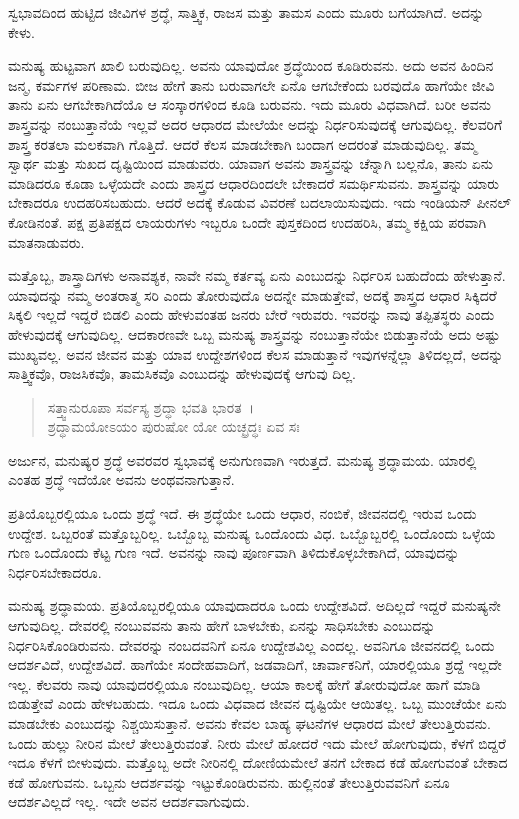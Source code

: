 {\small ಸ್ವಭಾವದಿಂದ ಹುಟ್ಟಿದ ಜೀವಿಗಳ ಶ್ರದ್ಧೆ, ಸಾತ್ತ್ವಿಕ, ರಾಜಸ ಮತ್ತು ತಾಮಸ ಎಂದು ಮೂರು ಬಗೆಯಾಗಿದೆ. ಅದನ್ನು ಕೇಳು.}

ಮನುಷ್ಯ ಹುಟ್ಟವಾಗ ಖಾಲಿ ಬರುವುದಿಲ್ಲ. ಅವನು ಯಾವುದೋ ಶ್ರದ್ಧೆಯಿಂದ ಕೂಡಿರುವನು. ಅದು ಅವನ ಹಿಂದಿನ ಜನ್ಮ, ಕರ್ಮಗಳ ಪರಿಣಾಮ. ಬೀಜ ಹೇಗೆ ತಾನು ಬರುವಾಗಲೇ ಏನೊ ಆಗಬೇಕೆಂದು ಬರವುದೊ ಹಾಗೆಯೇ ಜೀವಿ ತಾನು ಏನು ಆಗಬೇಕಾಗಿದೆಯೊ ಆ ಸಂಸ್ಕಾರಗಳಿಂದ ಕೂಡಿ ಬರುವನು. ಇದು ಮೂರು ವಿಧವಾಗಿದೆ. ಬರೀ ಅವನು ಶಾಸ್ತ್ರವನ್ನು ನಂಬುತ್ತಾನೆಯೆ ಇಲ್ಲವೆ ಅದರ ಆಧಾರದ ಮೇಲೆಯೇ ಅದನ್ನು ನಿರ್ಧರಿಸುವುದಕ್ಕೆ ಆಗುವುದಿಲ್ಲ. ಕೆಲವರಿಗೆ ಶಾಸ್ತ್ರ ಕರತಲಾ ಮಲಕವಾಗಿ ಗೊತ್ತಿದೆ. ಆದರೆ ಕೆಲಸ ಮಾಡಬೇಕಾಗಿ ಬಂದಾಗ ಅದರಂತೆ ಮಾಡುವುದಿಲ್ಲ. ತಮ್ಮ ಸ್ವಾರ್ಥ ಮತ್ತು ಸುಖದ ದೃಷ್ಟಿಯಿಂದ ಮಾಡುವರು. ಯಾವಾಗ ಅವನು ಶಾಸ್ತ್ರವನ್ನು ಚೆನ್ನಾಗಿ ಬಲ್ಲನೊ, ತಾನು ಏನು ಮಾಡಿದರೂ ಕೂಡಾ ಒಳ್ಳೆಯದೇ ಎಂದು ಶಾಸ್ತ್ರದ ಆಧಾರದಿಂದಲೇ ಬೇಕಾದರೆ ಸಮರ್ಥಿಸುವನು. ಶಾಸ್ತ್ರವನ್ನು ಯಾರು ಬೇಕಾದರೂ ಉದಹರಿಸಬಹುದು. ಆದರೆ ಅದಕ್ಕೆ ಕೊಡುವ ವಿವರಣೆ ಬದಲಾಯಿಸುವುದು. ಇದು ಇಂಡಿಯನ್ ಪೀನಲ್ ಕೋಡಿನಂತೆ. ಪಕ್ಷ ಪ್ರತಿಪಕ್ಷದ ಲಾಯರುಗಳು ಇಬ್ಬರೂ ಒಂದೇ ಪುಸ್ತಕದಿಂದ ಉದಹರಿಸಿ, ತಮ್ಮ ಕಕ್ಷಿಯ ಪರವಾಗಿ ಮಾತನಾಡುವರು.

ಮತ್ತೊಬ್ಬ, ಶಾಸ್ತ್ರಾದಿಗಳು ಅನಾವಶ್ಯಕ, ನಾವೇ ನಮ್ಮ ಕರ್ತವ್ಯ ಏನು ಎಂಬುದನ್ನು ನಿರ್ಧರಿಸ ಬಹುದೆಂದು ಹೇಳುತ್ತಾನೆ. ಯಾವುದನ್ನು ನಮ್ಮ ಅಂತರಾತ್ಮ ಸರಿ ಎಂದು ತೋರುವುದೊ ಅದನ್ನೇ ಮಾಡುತ್ತೇವೆ, ಅದಕ್ಕೆ ಶಾಸ್ತ್ರದ ಆಧಾರ ಸಿಕ್ಕಿದರೆ ಸಿಕ್ಕಲಿ ಇಲ್ಲದೆ ಇದ್ದರೆ ಬಿಡಲಿ ಎಂದು ಹೇಳುವಂತಹ ಜನರು ಬೇರೆ ಇರುವರು. ಇವರನ್ನು ನಾವು ತಪ್ಪಿತಸ್ಥರು ಎಂದು ಹೇಳುವುದಕ್ಕೆ ಆಗುವುದಿಲ್ಲ. ಆದಕಾರಣವೇ ಒಬ್ಬ ಮನುಷ್ಯ ಶಾಸ್ತ್ರವನ್ನು ನಂಬುತ್ತಾನೆಯೇ ಬಿಡುತ್ತಾನೆಯೆ ಅದು ಅಷ್ಟು ಮುಖ್ಯವಲ್ಲ. ಅವನ ಜೀವನ ಮತ್ತು ಯಾವ ಉದ್ದೇಶಗಳಿಂದ ಕೆಲಸ ಮಾಡುತ್ತಾನೆ ಇವುಗಳನ್ನೆಲ್ಲಾ ತಿಳಿದಲ್ಲದೆ, ಅದನ್ನು ಸಾತ್ತ್ವಿಕವೊ, ರಾಜಸಿಕವೊ, ತಾಮಸಿಕವೊ ಎಂಬುದನ್ನು ಹೇಳುವುದಕ್ಕೆ ಆಗುವು ದಿಲ್ಲ.

\begin{verse}
ಸತ್ತ್ವಾನುರೂಪಾ ಸರ್ವಸ್ಯ ಶ್ರದ್ಧಾ ಭವತಿ ಭಾರತ~।\\ಶ್ರದ್ಧಾಮಯೋಽಯಂ ಪುರುಷೋ ಯೋ ಯಚ್ಛ್ರದ್ಧಃ ಏವ ಸಃ 
\end{verse}

{\small ಅರ್ಜುನ, ಮನುಷ್ಯರ ಶ್ರದ್ಧೆ ಅವರವರ ಸ್ವಭಾವಕ್ಕೆ ಅನುಗುಣವಾಗಿ ಇರುತ್ತದೆ. ಮನುಷ್ಯ ಶ್ರದ್ಧಾಮಯ. ಯಾರಲ್ಲಿ ಎಂತಹ ಶ್ರದ್ಧೆ ಇದೆಯೋ ಅವನು ಅಂಥವನಾಗುತ್ತಾನೆ.}

ಪ್ರತಿಯೊಬ್ಬರಲ್ಲಿಯೂ ಒಂದು ಶ್ರದ್ಧೆ ಇದೆ. ಈ ಶ್ರದ್ಧೆಯೇ ಒಂದು ಆಧಾರ, ನಂಬಿಕೆ, ಜೀವನದಲ್ಲಿ ಇರುವ ಒಂದು ಉದ್ದೇಶ. ಒಬ್ಬರಂತೆ ಮತ್ತೊಬ್ಬರಿಲ್ಲ. ಒಬ್ಬೊಬ್ಬ ಮನುಷ್ಯ ಒಂದೊಂದು ವಿಧ. ಒಬ್ಬೊಬ್ಬರಲ್ಲಿ ಒಂದೊಂದು ಒಳ್ಳೆಯ ಗುಣ ಒಂದೊಂದು ಕೆಟ್ಟ ಗುಣ ಇದೆ. ಅವನನ್ನು ನಾವು ಪೂರ್ಣವಾಗಿ ತಿಳಿದುಕೊಳ್ಳಬೇಕಾಗಿದೆ, ಯಾವುದನ್ನು ನಿರ್ಧರಿಸಬೇಕಾದರೂ.

ಮನುಷ್ಯ ಶ್ರದ್ಧಾಮಯ. ಪ್ರತಿಯೊಬ್ಬರಲ್ಲಿಯೂ ಯಾವುದಾದರೂ ಒಂದು ಉದ್ದೇಶವಿದೆ. ಅದಿಲ್ಲದೆ ಇದ್ದರೆ ಮನುಷ್ಯನೇ ಆಗುವುದಿಲ್ಲ. ದೇವರಲ್ಲಿ ನಂಬುವವನು ತಾನು ಹೇಗೆ ಬಾಳಬೇಕು, ಏನನ್ನು ಸಾಧಿಸಬೇಕು ಎಂಬುದನ್ನು ನಿರ್ಧರಿಸಿಕೊಂಡಿರುವನು. ದೇವರನ್ನು ನಂಬದವನಿಗೆ ಏನೂ ಉದ್ದೇಶವಿಲ್ಲ ಎಂದಲ್ಲ. ಅವನಿಗೂ ಜೀವನದಲ್ಲಿ ಒಂದು ಆದರ್ಶವಿದೆ, ಉದ್ದೇಶವಿದೆ. ಹಾಗೆಯೇ ಸಂದೇಹವಾದಿಗೆ, ಜಡವಾದಿಗೆ, ಚಾರ್ವಾಕನಿಗೆ, ಯಾರಲ್ಲಿಯೂ ಶ್ರದ್ದೆ ಇಲ್ಲದೇ ಇಲ್ಲ. ಕೆಲವರು ನಾವು ಯಾವುದರಲ್ಲಿಯೂ ನಂಬುವುದಿಲ್ಲ. ಆಯಾ ಕಾಲಕ್ಕೆ ಹೇಗೆ ತೋರುವುದೋ ಹಾಗೆ ಮಾಡಿ ಬಿಡುತ್ತೇವೆ ಎಂದು ಹೇಳಬಹುದು. ಇದೂ ಒಂದು ವಿಧವಾದ ಜೀವನ ದೃಷ್ಟಿಯೇ ಆಯಿತಲ್ಲ. ಒಬ್ಬ ಮುಂಚೆಯೇ ಏನು ಮಾಡಬೇಕು ಎಂಬುದನ್ನು ನಿಶ್ಚಯಿಸುತ್ತಾನೆ. ಅವನು ಕೇವಲ ಬಾಹ್ಯ ಘಟನೆಗಳ ಆಧಾರದ ಮೇಲೆ ತೇಲುತ್ತಿರುವನು. ಒಂದು ಹುಲ್ಲು ನೀರಿನ ಮೇಲೆ ತೇಲುತ್ತಿರುವಂತೆ. ನೀರು ಮೇಲೆ ಹೋದರೆ ಇದು ಮೇಲೆ ಹೋಗುವುದು, ಕೆಳಗೆ ಬಿದ್ದರೆ ಇದೂ ಕೆಳಗೆ ಬೀಳುವುದು. ಮತ್ತೊಬ್ಬ ಅದೇ ನೀರಿನಲ್ಲಿ ದೋಣಿಯಮೇಲೆ ತನಗೆ ಬೇಕಾದ ಕಡೆ ಹೋಗುವಂತೆ ಬೇಕಾದ ಕಡೆ ಹೋಗುವನು. ಒಬ್ಬನು ಆದರ್ಶವನ್ನು ಇಟ್ಟುಕೊಂಡಿರುವನು. ಹುಲ್ಲಿನಂತೆ ತೇಲುತ್ತಿರುವವನಿಗೆ ಏನೂ ಆದರ್ಶವಿಲ್ಲದೆ ಇಲ್ಲ. ಇದೇ ಅವನ ಆದರ್ಶವಾಗುವುದು.

